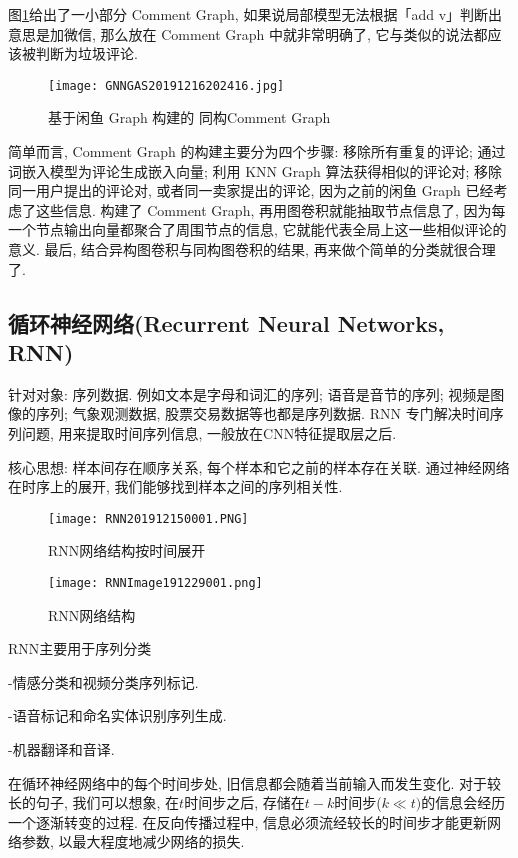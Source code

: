 图\ref{GNNGAS20191216202416}给出了一小部分 Comment Graph, 如果说局部模型无法根据「add v」判断出意思是加微信, 那么放在 Comment Graph 中就非常明确了, 它与类似的说法都应该被判断为垃圾评论.
\begin{figure}[H]
\centering
\texttt{[image: GNNGAS20191216202416.jpg]}
\caption{基于闲鱼 Graph 构建的 同构Comment Graph}
\label{GNNGAS20191216202416}
\end{figure}
简单而言, Comment Graph 的构建主要分为四个步骤: 移除所有重复的评论; 通过词嵌入模型为评论生成嵌入向量; 利用 KNN Graph 算法获得相似的评论对;
移除同一用户提出的评论对, 或者同一卖家提出的评论, 因为之前的闲鱼 Graph 已经考虑了这些信息.
构建了 Comment Graph, 再用图卷积就能抽取节点信息了, 因为每一个节点输出向量都聚合了周围节点的信息, 它就能代表全局上这一些相似评论的意义.
最后, 结合异构图卷积与同构图卷积的结果, 再来做个简单的分类就很合理了.
\subsection{循环神经网络(Recurrent Neural Networks, RNN)}
针对对象: 序列数据. 例如文本是字母和词汇的序列; 语音是音节的序列; 视频是图像的序列; 气象观测数据, 股票交易数据等也都是序列数据. RNN 专门解决时间序列问题, 用来提取时间序列信息, 一般放在CNN特征提取层之后.

核心思想: 样本间存在顺序关系,  每个样本和它之前的样本存在关联.  通过神经网络在时序上的展开,  我们能够找到样本之间的序列相关性.
\begin{figure}[H]
\centering
\texttt{[image: RNN201912150001.PNG]}
\caption{RNN网络结构按时间展开}
\label{RNN201912150001}
\end{figure}
\begin{figure}[H]
\centering
\texttt{[image: RNNImage191229001.png]}
\caption{RNN网络结构}
\label{RNNImage191229001}
\end{figure}

RNN主要用于序列分类

-情感分类和视频分类序列标记.

-语音标记和命名实体识别序列生成.

-机器翻译和音译.

在循环神经网络中的每个时间步处, 旧信息都会随着当前输入而发生变化. 对于较长的句子, 我们可以想象, 在$t$时间步之后, 存储在$t-k$时间步($k\ll t)$的信息会经历一个逐渐转变的过程.
在反向传播过程中, 信息必须流经较长的时间步才能更新网络参数, 以最大程度地减少网络的损失.

